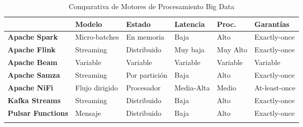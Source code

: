 \clearpage
\newpage

\begin{longtable}{|p{2cm}|p{2.5cm}|p{3cm}|p{2cm}|p{2cm}|p{2cm}|}
    \hline
    \textbf{ } & \textbf{Modelo} & \textbf{Estado} & \textbf{Latencia} & \textbf{Proc.} & \textbf{Garantías} \\
    \hline
    \textbf{Apache Spark} & Micro-batches & En memoria & Baja & Alto & Exactly-once \\
    \hline
    \textbf{Apache Flink} & Streaming & Distribuido & Muy baja & Muy Alto & Exactly-once \\
    \hline
    \textbf{Apache Beam} & Variable & Variable & Variable & Variable & Variable \\
    \hline
    \textbf{Apache Samza} & Streaming & Por partición & Baja & Alto & Exactly-once \\
    \hline
    \textbf{Apache NiFi} & Flujo dirigido & Procesador & Media-Alta & Medio & At-least-once \\
    \hline
    \textbf{Kafka Streams} & Streaming & Distribuido & Baja & Alto & Exactly-once \\
    \hline
    \textbf{Pulsar Functions} & Mensaje & Distribuido & Baja & Alto & Exactly-once \\
    \hline
    \caption{Comparativa de Motores de Procesamiento Big Data}
\end{longtable}

\clearpage
\newpage
